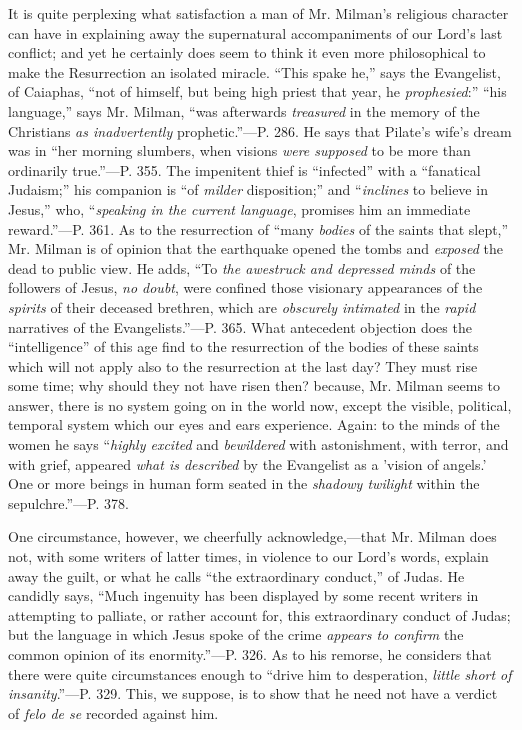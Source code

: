 It is quite perplexing what satisfaction a man of
Mr. Milman's religious character can have in explaining away the
supernatural accompaniments of our Lord's last conflict; and yet he
certainly does seem to think it even more philosophical to make the
Resurrection an isolated miracle. ``This spake he,'' says the
Evangelist, of Caiaphas, ``not of himself, but being high priest that
year, he \emph{prophesied}:'' ``his language,'' says Mr. Milman, ``was
afterwards \emph{treasured} in the memory of the Christians \emph{as
inadvertently} prophetic.''—P. 286. He says that Pilate's wife's
dream was in ``her morning slumbers, when visions \emph{were supposed}
to be more than ordinarily true.''—P. 355. The impenitent thief is ``infected''
with a ``fanatical Judaism;'' his companion is ``of \emph{milder}
disposition;'' and ``\emph{inclines} to believe in Jesus,'' who, ``\emph{speaking
in the current language}, promises him an immediate reward.''—P.
361. As to the resurrection of ``many \emph{bodies} of the saints that
slept,'' Mr. Milman is of opinion that the earthquake opened the tombs
and \emph{exposed} the dead to public view. He adds, ``To \emph{the
awestruck and depressed minds} of the followers of Jesus, \emph{no
doubt}, were confined those visionary appearances of the \emph{spirits}
of their deceased brethren, which are \emph{obscurely intimated} in
the \emph{rapid} narratives of the Evangelists.''—P. 365. What
antecedent objection does the ``intelligence'' of this age find to the
resurrection of the bodies of these saints which will not apply also
to the resurrection at the last day? They must rise some time; why
should they not have risen then? because, Mr. Milman seems to answer,
there is no system going on in the world now, except the visible,
political, temporal system which our eyes and ears experience. Again:
to the minds of the women he says ``\emph{highly excited} and \emph{bewildered}
with astonishment, with terror, and with grief, appeared \emph{what is
described} by the Evangelist as a 'vision of angels.' One or more
beings in human form seated in the \emph{shadowy twilight} within the
sepulchre.''—P. 378.

One circumstance, however, we cheerfully
acknowledge,—that Mr. Milman does not, with some writers of latter
times, in violence to our Lord's words, explain away the guilt, or
what he calls ``the extraordinary conduct,'' of Judas. He candidly says,
``Much ingenuity has been displayed by some recent writers in
attempting to palliate, or rather account for, this extraordinary
conduct of Judas; but the language in which Jesus spoke of the crime \emph{appears
to confirm} the common opinion of its enormity.''—P. 326. As to
his remorse, he considers that there were quite circumstances enough
to ``drive him to desperation, \emph{little short of insanity}.''—P.
329. This, we suppose, is to show that he need not have a verdict of \emph{felo
de se} recorded against him.

